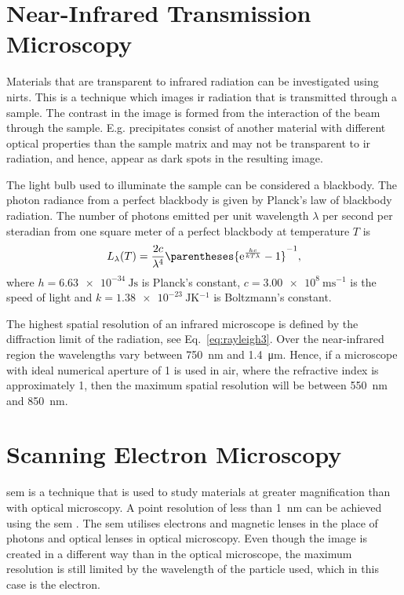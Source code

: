 \section{Near-Infrared Transmission Microscopy}
%
Materials that are transparent to infrared radiation can be investigated using \acf{nirts}. This is a technique which images \ac{ir} radiation that is transmitted through a sample. The contrast in the image is formed from the interaction of the beam through the sample. E.g. precipitates consist of another material with different optical properties than the sample matrix and may not be transparent to \ac{ir} radiation, and hence, appear as dark spots in the resulting image.

The light bulb used to illuminate the sample can be considered a blackbody. The photon radiance from a perfect blackbody is given by Planck's law of blackbody radiation. The number of photons emitted per unit wavelength $\lambda$ per second per steradian from one square meter of a perfect blackbody at temperature $T$ is \citep{liboff2003introductory}
\begin{equation}\label{eq:planck-law}
L_\lambda (T) = \frac{2c}{\lambda^4}\parentheses{\mathrm{e}^{\frac{hc}{kT\lambda}}-1}^{-1},
\end{equation}
where $h=\SI{6.63e-34}{\joule\second}$ is Planck's constant, $c=\SI{3.00e8}{\metre\second^{-1}}$ is the speed of light and $k=\SI{1.38e-23}{\joule\kelvin^{-1}}$ is Boltzmann's constant.

The highest spatial resolution of an infrared microscope is defined by the diffraction limit of the radiation, see Eq.~\eqref{eq:rayleigh3}. Over the near-infrared region the wavelengths vary between \SI{750}{\nano\metre} and \SI{1.4}{\micro\metre}. Hence, if a microscope with ideal numerical aperture of 1 is used in air, where the refractive index is approximately 1, then the maximum spatial resolution will be between \SI{550}{\nano\metre} and \SI{850}{\nano\metre}.

\section{Scanning Electron Microscopy}
\Acf{sem} is a technique that is used to study materials at greater magnification than with optical microscopy. A point resolution of less than \SI{1}{\nano\metre} can be achieved using the \ac{sem} \citep{goldstein2012scanning}. The \ac{sem} utilises electrons and magnetic lenses in the place of photons and optical lenses in optical microscopy. Even though the image is created in a different way than in the optical microscope, the maximum resolution is still limited by the wavelength of the particle used, which in this case is the electron. 

